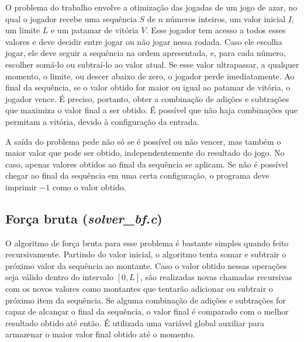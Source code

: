 \documentclass[10pt,a4paper]{article}
\numberwithin{equation}{section}
\begin{document}
O problema do trabalho envolve a otimização das jogadas de um jogo de azar, no qual o jogador recebe uma sequência $S$ de $n$ números inteiros, um valor inicial $I$, um limite $L$ e um patamar de vitória $V$. Esse jogador tem acesso a todos esses valores e deve decidir entre jogar ou não jogar nessa rodada. Caso ele escolha jogar, ele deve seguir a sequência na ordem apresentada, e, para cada número, escolher somá-lo ou subtraí-lo ao valor atual. Se esse valor ultrapassar, a qualquer momento, o limite, ou descer abaixo de zero, o jogador perde imediatamente. Ao final da sequência, se o valor obtido for maior ou igual ao patamar de vitória, o jogador vence. É preciso, portanto, obter a combinação de adições e subtrações que maximiza o valor final a ser obtido. É possível que não haja combinações que permitam a vitória, devido à configuração da entrada.

A saída do problema pede não só se é possível ou não vencer, mas também o maior valor que pode ser obtido, independentemente do resultado do jogo. No caso, apenas valores obtidos ao final da sequência se aplicam. Se não é possível chegar ao final da sequência em uma certa configuração, o programa deve imprimir $-1$ como o valor obtido.

\subsection{Força bruta (\emph{solver\_bf.c})}

O algoritmo de força bruta para esse problema é bastante simples quando feito recursivamente. Partindo do valor inicial, o algoritmo tenta somar e subtrair o próximo valor da sequência ao montante. Caso o valor obtido nessas operações seja válido dentro do intervalo $[0,L]$, são realizadas novas chamadas recursivas com os novos valores como montantes que tentarão adicionar ou subtrair o próximo item da sequência. Se alguma combinação de adições e subtrações for capaz de alcançar o final da sequência, o valor final é comparado com o melhor resultado obtido até então. É utilizada uma variável global auxiliar para armazenar o maior valor final obtido até o momento.
\end{document}

